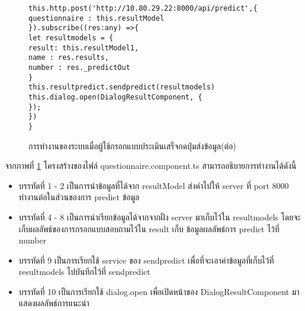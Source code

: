 \begin{figure}[H]
{\begin{lstlisting}
this.http.post('http://10.80.29.22:8000/api/predict',{
questionnaire : this.resultModel
}).subscribe((res:any) =>{
let resultmodels = {
result: this.resultModel1,
name : res.results,
number : res._predictOut
}
this.resultpredict.sendpredict(resultmodels) 
this.dialog.open(DialogResultComponent, {
});
})
}
\end{lstlisting}}
\caption{การทำงานของระบบเมื่อผู้ใช้กรอกแบบประเมินเสร็จกดปุ่มส่งข้อมูล(ต่อ)}
\label{Fig:4-question2}
\end{figure}

จากภาพที่ \ref{Fig:4-question2} โครงสร้างของไฟล์ questionnaire.component.ts สามารถอธิบายการทำงานได้ดังนี้
\begin{itemize}[label={--}]
\item บรรทัดที่ 1 - 2 เป็นการนำข้อมูลที่ได้จาก resultModel ส่งค่าไปให้ server ที่ port 8000 ทำงานต่อในส่วนของการ predict ข้อมูล
\item บรรทัดที่ 4 - 8 เป็นการนำเรียกข้อมูลได้จากจากฝั่ง server มาเก็บไว้ใน resultmodels โดยจะเก็บผลลัพธ์ของการกรอกแบบสอบถามไว้ใน result เก็บ ข้อมูลผลลัพธ์การ predict ไว้ที่ number
\item บรรทัดที่ 9 เป็นการเรียกใช้ service ของ sendpredict เพื่อที่จะเอาค่าข้อมูลที่เก็บไว้ที่ resultmodels ไปบันทึกไว้ที่ sendpredict 
\item บรรทัดที่ 10 เป็นการเรียกใช้ dialog.open เพื่อเปิดหน้าของ DialogResultComponent มาแสดงผลลัพธ์การแนะนำ
\end{itemize}


